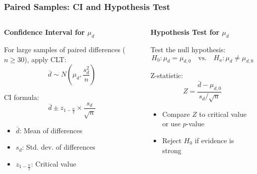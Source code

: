 \documentclass[handout]{beamer}
\begin{document}
\begin{frame}
\frametitle{Paired Samples: CI and Hypothesis Test}
\small 
\begin{columns}[t]
    \begin{column}{0.48\textwidth}
    \textbf{Confidence Interval for $\mu_d$}

    \vspace{0.5em}
    For large samples of paired differences ($n \ge 30$), apply CLT:
    \[
    \bar{d} \sim N\left(\mu_d, \frac{s_d^2}{n}\right)
    \]

    \vspace{0.3em}
    CI formula:
    \[
    \bar{d} \pm z_{1-\frac{\alpha}{2}} \times \frac{s_d}{\sqrt{n}} 
    \]

    \vspace{0.3em}
    \begin{itemize}
        \item $\bar{d}$: Mean of differences
        \item $s_d$: Std. dev. of differences
        \item $z_{1-\frac{\alpha}{2}}$: Critical value
    \end{itemize}
    \end{column}

    \begin{column}{0.48\textwidth}
    \textbf{Hypothesis Test for $\mu_d$}

    \vspace{0.5em}
    Test the null hypothesis:
    \[
    H_0: \mu_d = \mu_{d,0} \quad \text{vs.} \quad H_a: \mu_d \neq \mu_{d,0}
    \]

    \vspace{0.3em}
    Z-statistic:
    \[
    Z = \frac{\bar{d} - \mu_{d,0}}{s_d / \sqrt{n}}
    \]

    \vspace{0.3em}
    \begin{itemize}
        \item Compare $Z$ to critical value or use $p$-value
        \item Reject $H_0$ if evidence is strong
    \end{itemize}
    \end{column}
\end{columns}

\end{frame}
\end{document}
